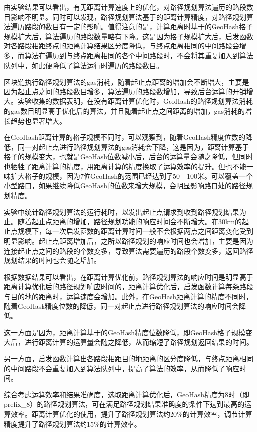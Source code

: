 由实验结果可以看出，有无距离计算速度上的优化，对路径规划算法遍历的路段数目影响不明显。同时可以发现，路径规划算法基于的距离计算精度，对路径规划算法遍历路段的数目有一定的影响。值得注意的是，计算距离时基于的GeoHash格子规模扩大后，算法遍历的路段数量略有下降。这是因为格子规模扩大后，启发函数对各路段相距终点的距离计算结果区分度降低，与终点距离相同的中间路段会增多，而算法在遍历到与终点距离相同的各个中间路段时，不会将其重复加入到算法队列中，如此便降低了算法运行时遍历的路段数目。

区块链执行路径规划算法的gas消耗，随着起止点距离的增加会不断增大，主要是因为起止点之间的路段数目增多，算法遍历的路段数增加，导致后台运算的开销增大。实验收集的数据表明，在没有距离计算优化时，GeoHash的路径规划算法消耗的gas数目明显高于优化后的算法，并且随着起止点之间距离的增加，gas消耗的增长趋势也显著增大。

​在GeoHash距离计算的格子规模不同时，可以观察到，随着GeoHash精度位数的降低，同一对起止点进行路径规划算法的gas消耗会下降，这是因为，距离计算基于格子的规模变大，也就是GeoHash位数减小后，后台的运算量会随之降低，但同时也牺牲了距离计算的精度，用距离计算的精度换取了运算效率的提升。但也不能一味扩大格子的规模，因为7位GeoHash的范围已经达到了50—100米。可以覆盖一个小型路口，如果继续降低GeoHash的位数来增大规模，会明显影响路口处的路径规划精度。

实验中统计路径规划算法的运行耗时，以发出起止点请求到收到路径规划结果为止。随着起止点距离的增加，路径规划功能的响应时间会不断增大。在30km的起止点规模下，每一次启发函数的距离计算时间一般不会根据两点之间距离变化受到明显影响。起止点距离增加后，之所以路径规划的响应时间也会增加，主要是因为连接起止点之间的路段的个数变多，导致算法需要遍历的路段个数变多，返回路径规划结果的时间也会随之增加。

根据数据结果可以看出，在距离计算优化前，路径规划算法的响应时间是明显高于距离计算优化后的路径规划响应时间的，距离计算优化后，启发函数计算每条路段与目的地的距离时，运算速度会增加。此外，在GeoHash距离计算的精度不同时，随着GeoHash精度位数的降低，同一对起止点进行路径规划算法的响应时间会降低。

这一方面是因为，距离计算基于的GeoHash精度位数降低，即GeoHash格子规模变大后，进行距离计算的运算量会随之降低，从而缩短了路径规划返回结果的时间。

另一方面，启发函数计算出各路段相距目的地距离的区分度降低，与终点距离相同的中间路段不会重复加入到算法队列中，提高了算法的效率，从而降低了响应时间。

综合考虑运算效率和结果准确度，选取距离计算优化后，GeoHash精度为8时（即prefix\_8）的路径规划算法，可在满足路径规划结果准确度的条件下达到最高的运算效率。距离计算优化的使用，提升了路径规划算法约20$\%$的计算效率，调节计算精度提升了路径规划算法约15$\%$的计算效率。

